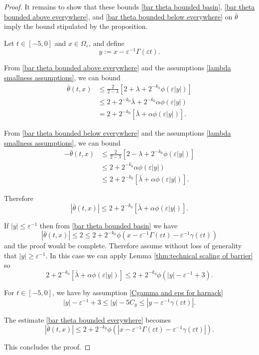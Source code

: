 \documentclass[11pt]{amsart}
\theoremstyle{remark}
\theoremstyle{definition}
\newcommand{\eps}{\varepsilon}
\newcommand{\bracket}[1]{\left[ #1 \right]}
\newcommand{\abs}[1]{\left\lvert #1 \right\rvert}
\newcommand{\n}{^{-1}}
\newcommand{\Cgamma}{C_g}
\begin{document}
\begin{proof}
It remains to show that these bounds \eqref{bar theta bounded basin}, \eqref{bar theta bounded above everywhere}, and \eqref{bar theta bounded below everywhere} on $\bar{\theta}$ imply the bound stipulated by the proposition.  

Let $t \in [-5,0]$ and $x \in \Omega_\eps$, and define 
\[ y := x - \eps\n \Gamma(\eps t). \]

From \eqref{bar theta bounded above everywhere} and the assumptions \eqref{lambda smallness assumptions}, we can bound
\begin{align*} 
\bar{\theta}(t,x) &\leq \frac{2}{2-\lambda} \bracket{2 + \lambda + 2^{-k_0} \phi(\eps |y|)}
\\ &\leq 2 + 2^{-k_0} \bar{\lambda} + 2^{-k_0} \alpha \phi(\eps |y|)
\\ &= 2 + 2^{-k_0} \bracket{\bar{\lambda} + \alpha \phi(\eps |y|)}.
\end{align*}

From \eqref{bar theta bounded below everywhere} and the assumptions \eqref{lambda smallness assumptions}, we can bound
\begin{align*}
-\bar{\theta}(t,x) &\leq \frac{2}{2-\lambda} \bracket{2 -\lambda + 2^{-k_0} \phi(\eps |y|)}
\\ &\leq 2 + 2^{-k_0} \alpha \phi(\eps |y|)
\\ &\leq 2 + 2^{-k_0} \bracket{\bar{\lambda} + \alpha \phi(\eps |y|)}.
\end{align*}

Therefore
\begin{equation} \label{bar theta bounded everywhere} \abs{\bar{\theta}(t,x)} \leq 2 + 2^{-k_0} \bracket{\bar{\lambda} + \alpha \phi(\eps |y|)}. \end{equation}

If $|y| \leq \eps\n$ then from \eqref{bar theta bounded basin} we have
\[ \abs{\bar{\theta}(t,x)} \leq 2 \leq 2 + 2^{-k_0} \phi(x - \eps\n \Gamma(\eps t) - \eps\n \gamma(\eps t)) \]
and the proof would be complete.  Therefore assume without loss of generality that $|y|\geq \eps\n$.  In this case we can apply Lemma \ref{thm:technical scaling of barrier} so
\[ 2 + 2^{-k_0} \bracket{\bar{\lambda} + \alpha \phi(\eps |y|)} \leq 2 + 2^{-k_0} \phi(|y|-\eps\n + 3). \]

For $t \in [-5,0]$, we have by assumption \eqref{Cgamma and eps for harnack}
\[ |y|-\eps\n+3 \leq |y| - 5 \Cgamma \leq |y - \eps\n\gamma(\eps t)|. \]

The estimate \eqref{bar theta bounded everywhere} becomes
\[ \abs{\bar{\theta}(t,x)} \leq 2 + 2^{-k_0} \phi(|x - \eps\n\Gamma(\eps t) - \eps\n\gamma(\eps t)|). \]

This concludes the proof.  
\end{proof}
\end{document}
